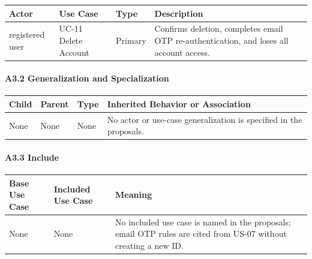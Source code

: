 \documentclass[12pt]{article}
\renewcommand{\baselinestretch}{1.5}
\begin{document}
\begingroup
\small
\renewcommand{\baselinestretch}{1.0}\selectfont
\renewcommand{\arraystretch}{1.15}
\setlength{\tabcolsep}{6pt}
\begin{longtable}{|>{\raggedright\arraybackslash}p{}|>{\raggedright\arraybackslash}p{}|>{\raggedright\arraybackslash}p{}|>{\raggedright\arraybackslash}p{}|}
\hline
\textbf{Actor} & \textbf{Use Case} & \textbf{Type} & \textbf{Description} \\ \hline
\endhead
registered user & UC-11 Delete Account & Primary & Confirms deletion, completes email OTP re-authentication, and loses all account access. \\ \hline
\end{longtable}
\endgroup
\par\medskip

\hypertarget{sec:a3-2-generalization-and-specialization}{}
\paragraph*{A3.2 Generalization and Specialization}
\par\medskip

\begingroup
\small
\renewcommand{\baselinestretch}{1.0}\selectfont
\renewcommand{\arraystretch}{1.15}
\setlength{\tabcolsep}{6pt}
\begin{longtable}{|>{\raggedright\arraybackslash}p{}|>{\raggedright\arraybackslash}p{}|>{\raggedright\arraybackslash}p{}|>{\raggedright\arraybackslash}p{}|}
\hline
\textbf{Child} & \textbf{Parent} & \textbf{Type} & \textbf{Inherited Behavior or Association} \\ \hline
\endhead
None & None & None & No actor or use-case generalization is specified in the proposals. \\ \hline
\end{longtable}
\endgroup
\par\medskip

\hypertarget{sec:a3-3-include}{}
\paragraph*{A3.3 Include}
\par\medskip

\begingroup
\small
\renewcommand{\baselinestretch}{1.0}\selectfont
\renewcommand{\arraystretch}{1.15}
\setlength{\tabcolsep}{6pt}
\begin{longtable}{|>{\raggedright\arraybackslash}p{}|>{\raggedright\arraybackslash}p{}|>{\raggedright\arraybackslash}p{}|}
\hline
\textbf{Base Use Case} & \textbf{Included Use Case} & \textbf{Meaning} \\ \hline
\endhead
None & None & No included use case is named in the proposals; email OTP rules are cited from US-07 without creating a new ID. \\ \hline
\end{longtable}
\endgroup
\par\medskip
\end{document}
